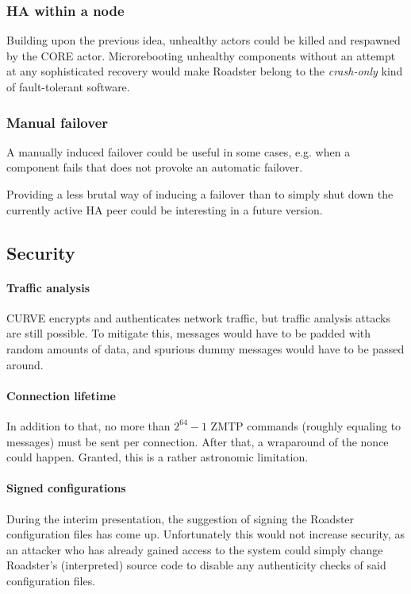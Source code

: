 \subsubsection{HA within a node}
Building upon the previous idea, unhealthy actors could be killed and respawned
by the CORE actor.  Microrebooting unhealthy components without an attempt at
any sophisticated recovery would make Roadster belong to the \emph{crash-only}
kind of fault-tolerant software.

\subsubsection{Manual failover}\label{sec:discussion:ha:manual-failover}
A manually induced failover could be useful in some cases, e.g. when a
component fails that does not provoke an automatic failover.

Providing a less brutal way of inducing a failover than to simply shut down the
currently active HA peer could be interesting in a future version.



\subsection{Security}

\paragraph{Traffic analysis}
CURVE \zmq encrypts and authenticates network traffic, but traffic analysis
attacks are still possible. To mitigate this, messages would have to be padded
with random amounts of data, and spurious dummy messages would have to be
passed around.

\paragraph{Connection lifetime}
In addition to that, no more than $2^{64} - 1$ ZMTP commands (roughly equaling to
messages) must be sent per connection. After that, a wraparound of the nonce
could happen. Granted, this is a rather astronomic limitation.

\paragraph{Signed configurations}
During the interim presentation, the suggestion of signing the Roadster configuration files has come up.
Unfortunately this would not increase security, as an attacker who has already
gained access to the system could simply change Roadster's (interpreted) source
code to disable any authenticity checks of said configuration files.


